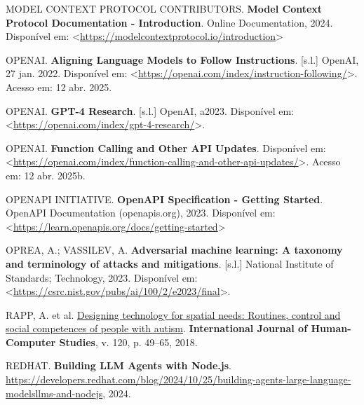 \documentclass[
]{article}
\newlength{\cslhangindent}
\newenvironment{CSLReferences}[2] %
 {\begin{list}{}{%
  \setlength{\itemindent}{0pt}
  \setlength{\leftmargin}{0pt}
  \setlength{\parsep}{0pt}
  \ifodd #1
   \setlength{\leftmargin}{\cslhangindent}
   \setlength{\itemindent}{-1\cslhangindent}
  \fi
  \setlength{\itemsep}{#2\baselineskip}}}
 {\end{list}}
\begin{document}
\begin{CSLReferences}{0}{1}
MODEL CONTEXT PROTOCOL CONTRIBUTORS. \textbf{{Model Context Protocol
Documentation - Introduction}}. Online Documentation, 2024. Disponível
em:
\textless{}\url{https://modelcontextprotocol.io/introduction}\textgreater{}

OPENAI. \textbf{Aligning Language Models to Follow Instructions}.
{[}s.l.{]} OpenAI, 27 jan. 2022. Disponível em:
\textless{}\url{https://openai.com/index/instruction-following/}\textgreater.
Acesso em: 12 abr. 2025.

OPENAI. \textbf{GPT-4 Research}. {[}s.l.{]} OpenAI, a2023. Disponível
em:
\textless{}\url{https://openai.com/index/gpt-4-research/}\textgreater.

OPENAI. \textbf{Function Calling and Other API Updates}. Disponível em:
\textless{}\url{https://openai.com/index/function-calling-and-other-api-updates/}\textgreater.
Acesso em: 12 abr. 2025b.

OPENAPI INITIATIVE. \textbf{{OpenAPI Specification - Getting Started}}.
OpenAPI Documentation (openapis.org), 2023. Disponível em:
\textless{}\url{https://learn.openapis.org/docs/getting-started}\textgreater{}

OPREA, A.; VASSILEV, A. \textbf{Adversarial machine learning: A taxonomy
and terminology of attacks and mitigations}. {[}s.l.{]} National
Institute of Standards; Technology, 2023. Disponível em:
\textless{}\url{https://csrc.nist.gov/pubs/ai/100/2/e2023/final}\textgreater.

RAPP, A. et al.
\href{https://doi.org/10.1016/j.ijhcs.2018.07.005}{Designing technology
for spatial needs: Routines, control and social competences of people
with autism}. \textbf{International Journal of Human-Computer Studies},
v. 120, p. 49--65, 2018.

REDHAT. \textbf{Building LLM Agents with Node.js}.
\url{https://developers.redhat.com/blog/2024/10/25/building-agents-large-language-modelsllms-and-nodejs},
2024.

\end{CSLReferences}
\end{document}
